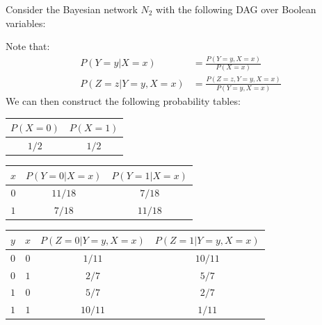\documentclass{article}
\begin{document}
\clearpage
\problem{}
Consider the Bayesian network $N_2$ with the following DAG over Boolean variables:
\begin{center}
\end{center}
Note that:
\begin{align*}
    P(Y = y | X = x) & = \frac{P(Y = y, X = x)}{P(X = x)} \\
    P(Z = z | Y = y, X = x) & = \frac{P(Z = z, Y = y, X = x)}{P(Y = y, X = x)}
\end{align*}
We can then construct the following probability tables:
\begin{center}
\begin{tabular}{|c|c|}
    \hline
    $P(X = 0)$ & $P(X = 1)$ \\
    \hline
    $1/2$ & $1/2$ \\
    \hline
\end{tabular}
\end{center}
\begin{center}
\begin{tabular}{|c|c|c|}
    \hline
    $x$ & $P(Y = 0 | X = x)$ & $P(Y = 1 | X = x)$ \\
    \hline
    $0$ & $11/18$ & $7/18$ \\
    \hline
    $1$ & $7/18$ & $11/18$ \\
    \hline
\end{tabular}
\end{center}
\begin{center}
\begin{tabular}{|c|c|c|c|}
    \hline
    $y$ & $x$ & $P(Z = 0 | Y = y, X = x)$ & $P(Z = 1 | Y = y, X = x)$ \\
    \hline
    $0$ & $0$ & $1/11$ & $10/11$ \\
    \hline
    $0$ & $1$ & $2/7$ & $5/7$ \\
    \hline
    $1$ & $0$ & $5/7$ & $2/7$ \\
    \hline
    $1$ & $1$ & $10/11$ & $1/11$ \\
    \hline
\end{tabular}
\end{center}
\end{document}

